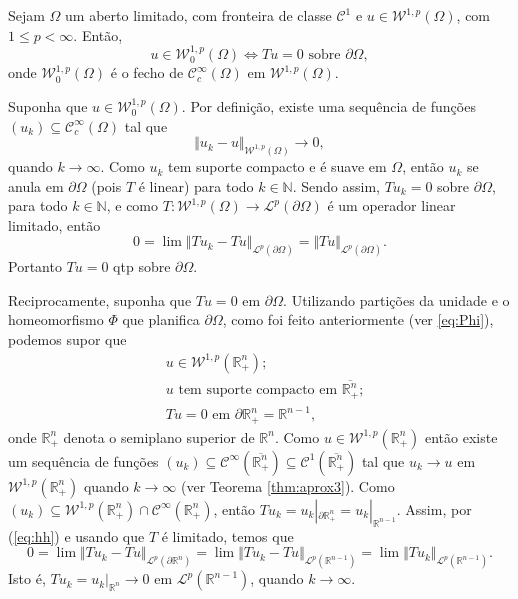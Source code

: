 \documentclass[a4paper, 11pt]{book}
\theoremstyle{definition}
\newcommand{\bN}{\mathbb{N}}
\newcommand{\bR}{\mathbb{R}}
\newcommand{\cC}{\mathcal{C}}
\newcommand{\cL}{\mathcal{L}}
\newcommand{\cW}{\mathcal{W}}
\begin{document}
\begin{tbox}[Funções traço zero em $\cW^{1,p}$] \label{thm:traco-2}
    Sejam $\Omega$ um aberto limitado, com fronteira de classe $\cC^1$ e $u \in \cW^{1,p}(\Omega)$, com $1 \leqslant p < \infty$. Então,
    \[
        u \in \cW_0^{1,p}(\Omega) \iff Tu = 0 \text{ sobre } \partial \Omega,
    \]
    onde $\cW_0^{1,p}(\Omega)$ é o fecho de $\cC^{\infty}_c(\Omega)$ em $\cW^{1,p}(\Omega)$.
\end{tbox}
\begin{prf}
    Suponha que $u \in \cW_0^{1,p}(\Omega)$. Por definição, existe uma sequência de funções $(u_k) \subseteq \cC^{\infty}_c(\Omega)$ tal que
    \[
        \Vert u_k - u \Vert_{\cW^{1,p}(\Omega)} \to 0,
    \]
    quando $k \to \infty$. Como $u_k$ tem suporte compacto e é suave em $\Omega$, então $u_k$ se anula em $\partial \Omega$ (pois $T$ é linear) para todo $k \in \bN$. Sendo assim, $Tu_k = 0$ sobre $\partial\Omega$, para todo $k \in \bN$, e como $T : \cW^{1,p}(\Omega) \to \cL^p(\partial \Omega)$ é um operador linear limitado, então
    \[
        0 = \lim \Vert Tu_k - Tu \Vert_{\cL^p(\partial \Omega)} = \Vert Tu \Vert_{\cL^p(\partial \Omega)}.
    \]
    Portanto $Tu =0$ qtp sobre $\partial \Omega$.

    Reciprocamente, suponha que $Tu = 0$ em $\partial \Omega$. Utilizando partições da unidade e o homeomorfismo $\Phi$ que planifica $\partial \Omega$, como foi feito anteriormente (ver \ref{eq:Phi}), podemos supor que
    \begin{equation} \label{eq:hh}
        \begin{aligned}
            &u \in \cW^{1,p}(\bR^n_+);\\
            &u \text{ tem suporte compacto em } \overline{\bR^n_+};\\
            &Tu = 0 \text{ em } \partial \bR^n_+ = \bR^{n-1},
        \end{aligned}
    \end{equation}
    onde $\bR^n_+$ denota o semiplano superior de $\bR^n$.
    Como $u \in \cW^{1,p}(\bR^n_+)$ então existe um sequência de funções $(u_k) \subseteq \cC^{\infty}(\overline{\bR^n_+}) \subseteq \cC^1(\overline{\bR^n_+})$ tal que $u_k \to u$ em $\cW^{1,p}(\bR^n_+)$ quando $k \to \infty$ (ver Teorema \ref{thm:aprox3}). Como $(u_k) \subseteq \cW^{1,p}(\bR^n_+) \cap \cC^\infty(\bR^n_+)$, então $T u_k = u_k |_{\partial \bR^n_+} = u_k |_{\bR^{n-1}}$.
    Assim, por (\ref{eq:hh}) e usando que $T$ é limitado, temos que
    \begin{equation} \label{eq:nanna}
        0 = \lim \Vert Tu_k - Tu \Vert_{\cL^p(\partial \bR^n)} = \lim \Vert Tu_k - Tu \Vert_{\cL^p(\bR^{n-1})} = \lim \Vert Tu_k \Vert_{\cL^p(\bR^{n-1})}.
    \end{equation}
    Isto é, $T u_k = u_k |_{\bR^n} \to 0$ em $\cL^p(\bR^{n-1})$, quando $k \to \infty$.


\end{prf}
\end{document}
